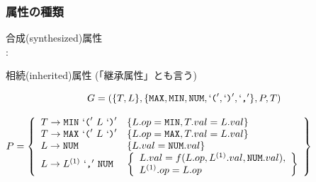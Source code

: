\documentclass[dvipdfmx]{beamer}
\begin{document}
\begin{frame}
  \frametitle{属性の種類}

  \begin{list}{}{}
    \item 合成(synthesized)属性\\
          :
    \item 相続(inherited)属性 (「継承属性」とも言う)\\
  \end{list}


  \[G=(\{T,L\},\{\texttt{MAX},\texttt{MIN},\texttt{NUM},`\texttt{(}',`\texttt{)}',`\texttt{,}'\},P,T)\]


  \vspace*{5pt}

  {\small

    $P=\left\{\begin{array}{ll}
        T\rightarrow\texttt{MIN}\ `\texttt{(}'\ L\ `\texttt{)}' & \{L.op=\texttt{MIN},T.val=L.val\}                                  \\
        T\rightarrow\texttt{MAX}\ `\texttt{(}'\ L\ `\texttt{)}' & \{L.op=\texttt{MAX},T.val=L.val\}                                  \\
        L\rightarrow\texttt{NUM}                                & \{L.val=\texttt{NUM}.val\}                                         \\
        L\rightarrow L^{(1)}\ `\texttt{,}'\ \texttt{NUM}        & \left\{\begin{array}{l}L.val=f(L.op,L^{(1)}.val,\texttt{NUM}.val), \\
                                                                           L^{(1)}.op=L.op\end{array}\right\}
      \end{array}\right\}$
  }
\end{frame}
\end{document}

